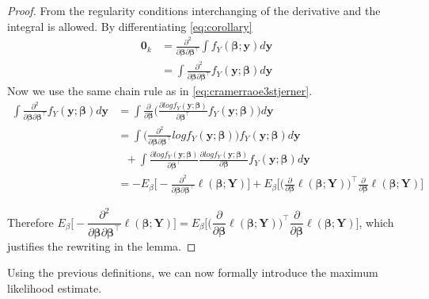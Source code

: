 \begin{proof}
From the regularity conditions interchanging of the derivative and the integral is allowed. By differentiating \eqref{eq:corollary}
\begin{align*}
\textbf{0}_{k} &= \frac{\partial^2}{\partial \boldsymbol{\beta} \partial \boldsymbol{\beta}^\top} \int f_Y(\boldsymbol{\beta};\textbf{y})d\textbf{y} \\
&=\int \frac{\partial^2}{\partial \boldsymbol{\beta} \partial \boldsymbol{\beta}^\top}f_Y(\textbf{y};\boldsymbol{\beta}) d\textbf{y}
\end{align*}
Now we use the same chain rule as in \eqref{eq:cramerraoe3stjerner}.
\begin{align*}
\int \frac{\partial^2}{\partial \boldsymbol{\beta} \partial \boldsymbol{\beta}^\top}f_Y(\textbf{y};\boldsymbol{\beta}) d\textbf{y} &= \int \frac{\partial}{\partial \boldsymbol{\beta}} \bigg( \frac{\partial log f_Y(\textbf{y};\boldsymbol{\beta})}{\partial \boldsymbol{\beta}^\top} f_Y(\textbf{y};\boldsymbol{\beta}) \bigg)d\textbf{y} \\
&= \int \bigg( \frac{\partial^2}{\partial \boldsymbol{\beta} \partial \boldsymbol{\beta}^\top } log f_Y(\textbf{y};\boldsymbol{\beta})  \bigg) f_Y(\textbf{y};\boldsymbol{\beta}) d\textbf{y} \\
& \ \ \ + \int \frac{\partial log f_Y(\textbf{y};\boldsymbol{\beta})}{\partial \boldsymbol{\beta}^\top} \frac{\partial log f_Y(\textbf{y};\boldsymbol{\beta})}{\partial \boldsymbol{\beta}} f_Y(\textbf{y};\boldsymbol{\beta}) d\textbf{y} \\
& =  -E_{\beta}\bigg[-\frac{\partial^2}{\partial \boldsymbol{\beta} \partial \boldsymbol{\beta}^\top} \ell(\boldsymbol{\beta};\textbf{Y}) \bigg]+  E_{\beta}\bigg[\bigg( \frac{\partial}{\partial \boldsymbol{\beta}}\ell(\boldsymbol{\beta};\textbf{Y}) \bigg)^\top \frac{\partial}{\partial \boldsymbol{\beta}}\ell(\boldsymbol{\beta};\textbf{Y})  \bigg]
\end{align*}

Therefore $E_{\beta}\bigg[-\dfrac{\partial^2}{\partial \boldsymbol{\beta} \partial \boldsymbol{\beta}^\top} \ell(\boldsymbol{\beta};\textbf{Y}) \bigg] = E_{\beta}\bigg[\bigg( \dfrac{\partial}{\partial \boldsymbol{\beta}}\ell(\boldsymbol{\beta};\textbf{Y}) \bigg)^\top \dfrac{\partial}{\partial \boldsymbol{\beta}}\ell(\boldsymbol{\beta};\textbf{Y})  \bigg]$, which justifies the rewriting in the lemma. 
\end{proof}

Using the previous definitions, we can now formally introduce the maximum likelihood estimate. 

